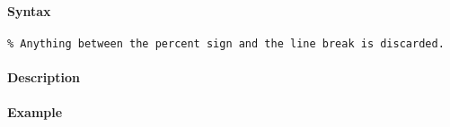 


	\paragraph{Syntax}

\begin{verbatim}
% Anything between the percent sign and the line break is discarded.
\end{verbatim}

\paragraph{Description}

\paragraph{Example}


